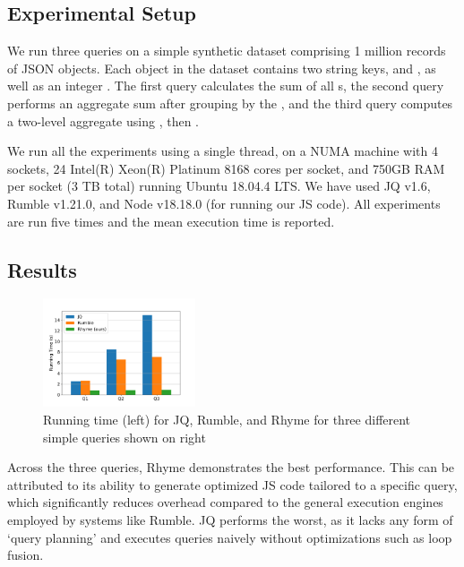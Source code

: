 \documentclass[runningheads]{llncs}
\newcommand{\lang}{Rhyme}
\begin{document}
\subsection{Experimental Setup}
We run three queries on a simple synthetic dataset comprising 1 million records of
JSON objects.
Each object in the dataset contains two string keys,  and , 
as well as an integer .
The first query calculates the sum of all s, the second query performs
an aggregate sum after grouping by the ,
and the third query computes a two-level aggregate using , then .

We run all the experiments using a single thread, on a NUMA machine
with 4 sockets, 24 Intel(R) Xeon(R) Platinum 8168 cores
per socket, and 750GB RAM per socket (3 TB total) running Ubuntu
18.04.4 LTS.
We have used JQ v1.6, Rumble v1.21.0, and Node v18.18.0 (for running our JS code).
All experiments are run five times and the mean execution time is reported.

\subsection{Results}
\begin{figure}
\vspace{-30pt}
\centering
\includegraphics[width=0.4\textwidth]{images/plot.pdf}
\caption{Running time (left) for JQ, Rumble, and Rhyme for three different simple queries shown
on right}\label{fig:plot}
\vspace{-20pt}
\end{figure} 
Across the three queries, \lang{} demonstrates the best performance.
This can be attributed to its ability to generate optimized JS code tailored
to a specific query, which significantly reduces overhead compared to the
general execution engines employed by systems like Rumble.
JQ performs the worst, as it lacks any form of
`query planning' and executes queries naively without optimizations
such as loop fusion.
\end{document}
